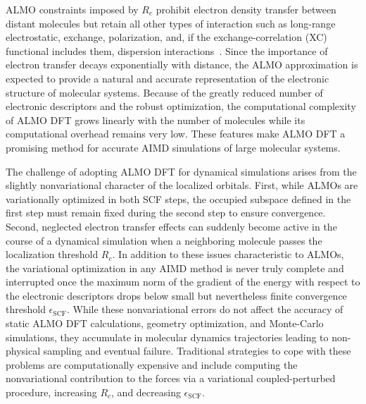 \documentclass[aps,prl,reprint,amsmath,amssymb]{revtex4-1}
\begin{document}
ALMO constraints imposed by $R_c$ prohibit electron density transfer between distant molecules but retain all other types of interaction such as long-range electrostatic, exchange, polarization, and, if the exchange-correlation (XC) functional includes them, dispersion interactions~\cite{a:theeda}. 
Since the importance of electron transfer decays exponentially with distance, the \mbox{ALMO} approximation is expected to provide a natural and accurate representation of the electronic structure of molecular systems. %
Because of the greatly reduced number of electronic descriptors and the robust optimization, the computational complexity of ALMO DFT grows linearly with the number of molecules while its computational overhead remains very low. These features make ALMO DFT a promising method for accurate AIMD simulations of large molecular systems.


The challenge of adopting ALMO DFT for dynamical simulations arises from the slightly nonvariational character of the localized orbitals. First, while ALMOs are variationally optimized in both SCF steps, the occupied subspace defined in the first step must remain fixed during the second step to ensure convergence. Second, neglected electron transfer effects can suddenly become active in the course of a dynamical simulation when a neighboring molecule passes the localization threshold $R_{c}$. In addition to these issues characteristic to ALMOs, the variational optimization in any AIMD method is never truly complete and interrupted once the maximum norm of the gradient of the energy with respect to the electronic descriptors drops below small but nevertheless finite convergence threshold $\epsilon_{\text{SCF}}$. While these nonvariational errors do not affect the accuracy of static ALMO DFT calculations, geometry optimization, and Monte-Carlo simulations, they accumulate in molecular dynamics trajectories leading to non-physical sampling and eventual failure. 
Traditional strategies to cope with these problems are computationally expensive and include computing the nonvariational contribution to the forces via a variational coupled-perturbed procedure, increasing $R_c$, and decreasing $\epsilon_{\text{SCF}}$. 
\end{document}
